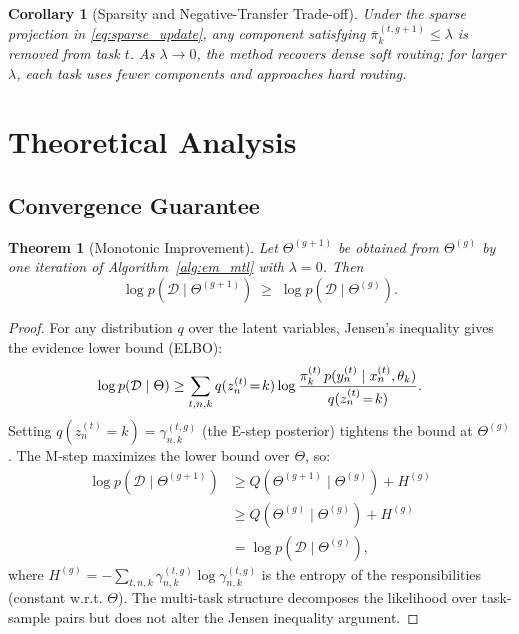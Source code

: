 \documentclass[preprint,12pt]{elsarticle}
\newtheorem{theorem}{Theorem}
\newtheorem{corollary}{Corollary}
\begin{document}
	\begin{corollary}[Sparsity and Negative-Transfer Trade-off]
		\label{cor:sparsity}
		Under the sparse projection in \eqref{eq:sparse_update}, any
		component satisfying
		$\bar{\pi}_k^{(t,g+1)} \le \lambda$ is removed from task $t$.
		As $\lambda\to 0$, the method recovers dense soft routing; for larger
		$\lambda$, each task uses fewer components and approaches hard
		routing.
	\end{corollary}
	
	\section{Theoretical Analysis}
	\label{sec:theory}
	
	\subsection{Convergence Guarantee}
	
	\begin{theorem}[Monotonic Improvement]
		\label{thm:mono}
		Let $\Theta^{(g+1)}$ be obtained from $\Theta^{(g)}$ by one
		iteration of Algorithm~\ref{alg:em_mtl} with $\lambda = 0$. Then
		\begin{equation}
			\log p\!\left(\mathcal{D}\mid\Theta^{(g+1)}\right)
			\;\ge\;
			\log p\!\left(\mathcal{D}\mid\Theta^{(g)}\right).
			\label{eq:mono}
		\end{equation}
	\end{theorem}
	
	\begin{proof}
		For any distribution $q$ over the latent variables, Jensen's
		inequality gives the evidence lower bound (ELBO):
		\[
		\log p(\mathcal{D}\mid\Theta)
		\ge \sum_{t,n,k} q(z_n^{(t)}\!=\!k)
		\log \frac{\pi_k^{(t)}\,p(y_n^{(t)}\mid x_n^{(t)},\theta_k)}{%
			q(z_n^{(t)}\!=\!k)}.
		\]
		Setting $q(z_n^{(t)}\!=\!k) = \gamma_{n,k}^{(t,g)}$ (the E-step
		posterior) tightens the bound at $\Theta^{(g)}$. The M-step
		maximizes the lower bound over $\Theta$, so:
		\begin{align*}
			\log p(\mathcal{D}\mid\Theta^{(g+1)})
			&\ge Q(\Theta^{(g+1)}\mid\Theta^{(g)}) + H^{(g)} \\
			&\ge Q(\Theta^{(g)}\mid\Theta^{(g)}) + H^{(g)} \\
			&= \log p(\mathcal{D}\mid\Theta^{(g)}),
		\end{align*}
		where $H^{(g)} = -\sum_{t,n,k}\gamma_{n,k}^{(t,g)}\log\gamma_{n,k}^{(t,g)}$
		is the entropy of the responsibilities (constant w.r.t. $\Theta$).
		The multi-task structure decomposes the likelihood over task-sample
		pairs but does not alter the Jensen inequality argument.
	\end{proof}
	
\end{document}
